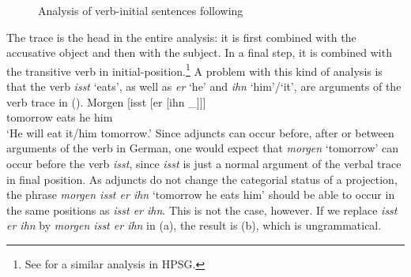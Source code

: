 \begin{figure}
\caption{\label{Abbildung-CG-isst-der-junge-den-kuchen-jacobs}Analysis of verb-initial sentences following \citet{Jacobs91a}}
\end{figure}%
The trace is the head in the entire analysis: it is first combined with the accusative object and then with the subject. In a final step,
it is combined with the transitive verb in initial-position.\footnote{ See  for a similar analysis in HPSG\indexhpsg.
} 
A problem with this kind of analysis is that the verb \emph{isst} `eats', as well as \emph{er} `he' and
\emph{ihn} `him'/`it', are arguments of the verb trace in ().
\ea
\gll Morgen [isst [er [ihn \_]]]\\
	 tomorrow \spacebr{}eats \spacebr{}he \spacebr{}him\\
\glt `He will eat it/him tomorrow.'
\z
Since adjuncts can occur before, after or between arguments of the verb in German, one would expect that \emph{morgen} `tomorrow' can occur before the verb
\emph{isst}, since \emph{isst} is just a normal argument of the verbal trace in final position. As adjuncts do not change the categorial status of a projection, the phrase \emph{morgen isst er ihn} `tomorrow he eats him' should be able to
occur in the same positions as \emph{isst er ihn}. This is not the case, however. If we replace
\emph{isst er ihn} by \emph{morgen isst er ihn} in (a), the result is (b), which is ungrammatical.
\eal
{}
